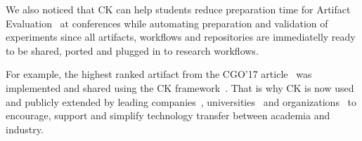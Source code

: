 We also noticed that CK can help students reduce preparation time 
for Artifact Evaluation~\cite{ctuning-ae1} at conferences while automating preparation 
and validation of experiments  since all artifacts, workflows and repositories are immediatelly ready
to be shared, ported and plugged in to research workflows.

For example, the highest ranked artifact from
the CGO'17 article~\cite{Ainsworth:2017:SPI:3049832.3049865}
was implemented and shared using the CK framework~\cite{cgo17-artifact}.
%
That is why CK is now used and publicly extended by leading
companies~\cite{ck-date16},
universities~\cite{Ainsworth:2017:SPI:3049832.3049865}
and organizations~\cite{ck-acm} to encourage, support and simplify
technology transfer between academia and industry.
